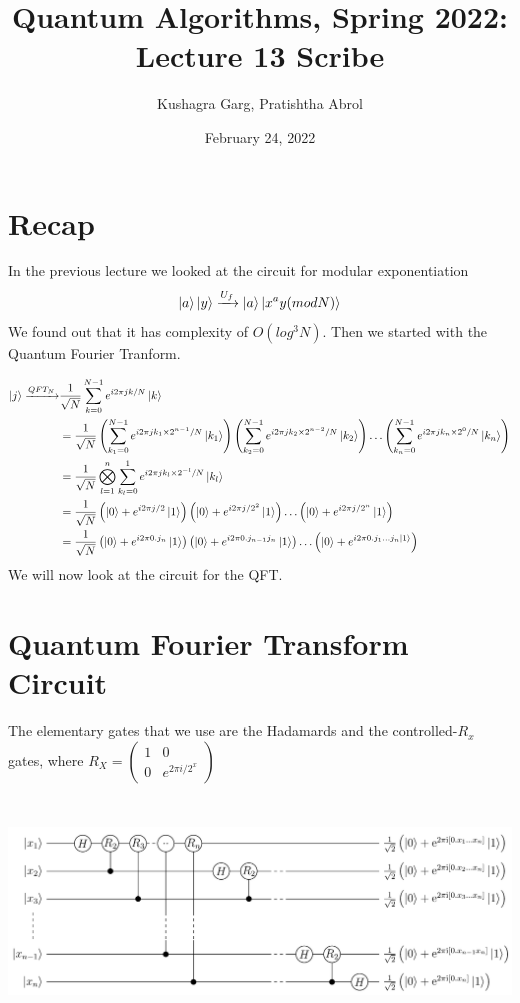\documentclass[11.5pt, paper=a4]{article}
\title{Quantum Algorithms, Spring 2022: Lecture 13 Scribe}
\author{ Kushagra Garg, Pratishtha Abrol}
\date{February 24, 2022}
\theoremstyle{definition}
\numberwithin{theorem}{section}
\begin{document}
\maketitle
\section{Recap}
In the previous lecture we looked at the circuit for modular exponentiation 
\begin{equation*}
    \ket{a}\ket{y} \xrightarrow{U_f} \ket{a}\ket{x^a y (mod N)}
\end{equation*}
We found out that it has complexity of $O(log^3N)$. Then we started with the Quantum Fourier Tranform. 


\begin{align*}
    \ket{j} \xrightarrow{QFT_N} & \frac{1}{\sqrt{N}}\sum_{k=0}^{N-1}e^{i2\pi jk/N} \ket{k} \\
    & = \frac{1}{\sqrt{N}} \left(\sum_{k_1=0}^{N-1}e^{i2\pi jk_1\times2^{n-1}/N} \ket{k_1}\right) 
    \left(\sum_{k_2=0}^{N-1}e^{i2\pi jk_2\times2^{n-2}/N} \ket{k_2}\right) \dots
    \left(\sum_{k_n=0}^{N-1}e^{i2\pi jk_n\times2^{0}/N} \ket{k_n}\right) \\
    &=  \frac{1}{\sqrt{N}} \bigotimes_{l=1}^n \sum_{k_l=0}^1 e^{i2\pi jk_l\times2^{-l}/N} \ket{k_l} \\
    &= \frac{1}{\sqrt{N}} \left(\ket{0} + e^{i2\pi j/2} \ket{1}\right)
     \left(\ket{0} + e^{i2\pi j/2^2} \ket{1}\right) \dots
      \left(\ket{0} + e^{i2\pi j/2^n} \ket{1}\right) \\
      &= \frac{1}{\sqrt{N}} \left(\ket{0} + e^{i2\pi 0.j_n} \ket{1}\right)
     \left(\ket{0} + e^{i2\pi 0.j_{n-1}j_n} \ket{1}\right) \dots
      \left(\ket{0} + e^{i2\pi 0.j_1 \dots j_n \ket{1}}\right) 
\end{align*}
We will now look at the circuit for the QFT. 
\section{Quantum Fourier Transform Circuit}
The elementary gates that we use are the Hadamards and the controlled-$R_x$ gates, where 
$R_X = 
\begin{pmatrix}
1 & 0 \\
0 & e^{2\pi i /2^x}
\end{pmatrix}
$

\includegraphics[width=15cm, height=6cm]{images/qft_circuit.png}
\end{document}
